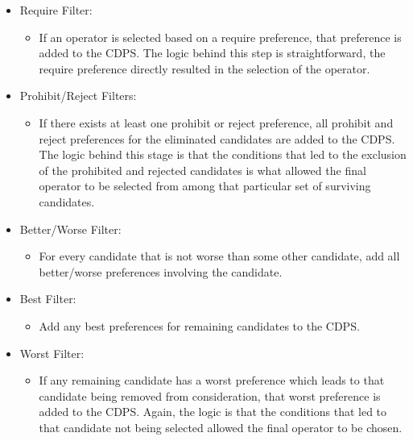 \begin{itemize}
\item Require Filter: 
	\begin{itemize}
	\item If an operator is selected based on a require preference, that preference is added to the CDPS.  The logic behind this step is straightforward, the require preference directly resulted in the selection of the operator.
	\end{itemize}

\item Prohibit/Reject Filters: 
	\begin{itemize}
	\item If there exists at least one prohibit or reject preference, all prohibit and reject preferences for the eliminated candidates are added to the CDPS.  The logic behind this stage is that the conditions that led to the exclusion of the prohibited and rejected candidates is what allowed the final operator to be selected from among that particular set of surviving candidates.
	\end{itemize}

\item Better/Worse Filter: 
	\begin{itemize}
	\item For every candidate that is not worse than some other candidate, add all better/worse preferences involving the candidate.
	\end{itemize}

\item Best Filter: 
	\begin{itemize}
	\item Add any best preferences for remaining candidates to the CDPS. 
	\end{itemize}

\item Worst Filter:
	\begin{itemize}
	\item If any remaining candidate has a worst preference which leads to that candidate being removed from consideration, that worst preference is added to the CDPS.  Again, the logic is that the conditions that led to that candidate not being selected allowed the final operator to be chosen.
	\end{itemize}


\end{itemize}
